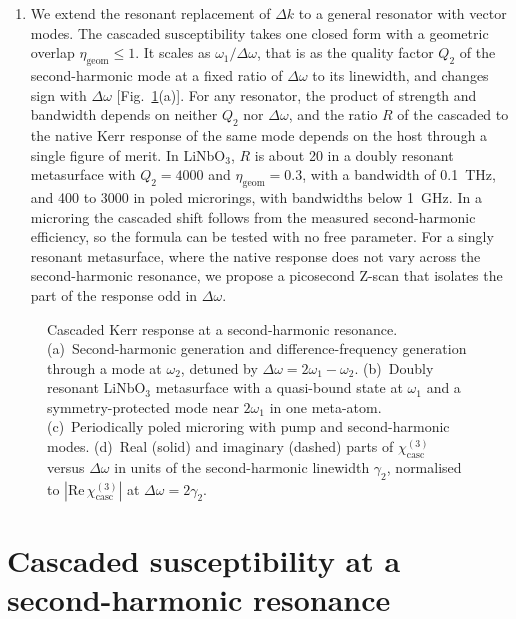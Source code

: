 \documentclass{optica-article}
\newcommand{\chicasc}{\chi^{(3)}_{\mathrm{casc}}}
\newcommand{\Dom}{\Delta\omega}
\newcommand{\etag}{\eta_{\mathrm{geom}}}
\newcommand{\figbox}[1]{%
  \fbox{\parbox[c][#1][c]{0.9\linewidth}{\centering\small figure in preparation}}}
\begin{document}
\begin{enumerate}
  back-conversion of the second harmonic in a metasurface has been treated
  as pump depletion~\cite{tu2024}; to our knowledge, the Kerr response it
  produces on the pump has not been evaluated or compared with the native
  response of the host.
\item We extend the resonant replacement of $\Delta k$ to a general
  resonator with vector modes.  The cascaded susceptibility takes one closed
  form with a geometric overlap $\etag\le1$.  It scales as
  $\omega_1/\Dom$, that is as the quality factor $Q_2$ of the
  second-harmonic mode at a fixed ratio of $\Dom$ to its linewidth, and
  changes sign with $\Dom$ [Fig.~\ref{fig:concept}(a)].  For any resonator,
  the product of strength and bandwidth depends on neither $Q_2$ nor
  $\Dom$, and the ratio $R$ of the cascaded to the native Kerr response of
  the same mode depends on the host through a single figure of merit.  In
  LiNbO$_3$, $R$ is about 20 in a doubly resonant metasurface with $Q_2=4000$
  and $\etag=0.3$, with a bandwidth of 0.1~THz, and 400 to 3000 in poled
  microrings, with bandwidths below 1~GHz.  In a microring the cascaded
  shift follows from the measured second-harmonic efficiency, so the
  formula can be tested with no free parameter.  For a singly resonant
  metasurface, where the native response does not vary across the
  second-harmonic resonance, we propose a picosecond Z-scan that isolates the
  part of the response odd in $\Dom$.
\end{enumerate}

\begin{figure}[htbp]
  \centering
  \figbox{4.5cm}
  \caption{Cascaded Kerr response at a second-harmonic resonance.
    (a)~Second-harmonic generation and difference-frequency generation
    through a mode at $\omega_2$, detuned by $\Dom=2\omega_1-\omega_2$.
    (b)~Doubly resonant LiNbO$_3$ metasurface with a quasi-bound state at
    $\omega_1$ and a symmetry-protected mode near $2\omega_1$ in one
    meta-atom.
    (c)~Periodically poled microring with pump and second-harmonic modes.
    (d)~Real (solid) and imaginary (dashed) parts of $\chicasc$ versus
    $\Dom$ in units of the second-harmonic linewidth $\gamma_2$, normalised to
    $|\mathrm{Re}\,\chicasc|$ at $\Dom=2\gamma_2$.}
  \label{fig:concept}
\end{figure}


\section{Cascaded susceptibility at a second-harmonic resonance}\label{sec:theory}
\end{document}

